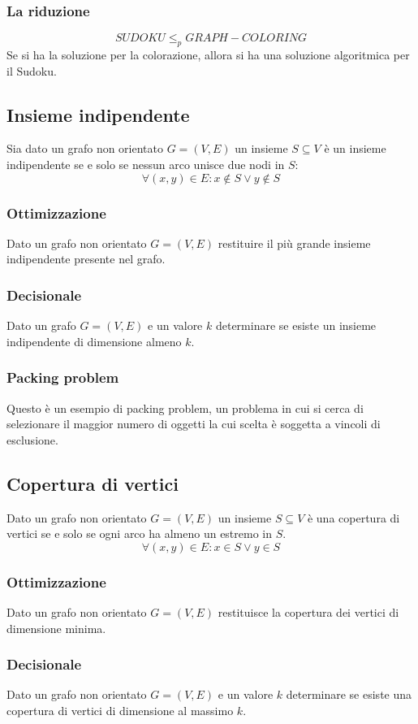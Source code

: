 \subsubsection{La riduzione}
$$SUDOKU \le_p GRAPH-COLORING$$
Se si ha la soluzione per la colorazione, allora si ha una soluzione algoritmica per il Sudoku.
\subsection{Insieme indipendente}
Sia dato un grafo non orientato $G=(V, E)$ un insieme $S\subseteq V$ \`e un insieme indipendente se e solo se nessun arco unisce due nodi in $S$:
$$\forall(x, y)\in E: x\not\in S\lor y\not\in S$$
\subsubsection{Ottimizzazione}
Dato un grafo non orientato $G=(V, E)$ restituire il pi\`u grande insieme indipendente presente nel grafo.
\subsubsection{Decisionale}
Dato un grafo $G=(V, E)$ e un valore $k$ determinare se esiste un insieme indipendente di dimensione almeno $k$.
\subsubsection{Packing problem}
Questo \`e un esempio di packing problem, un problema in cui si cerca di selezionare il maggior numero di oggetti la cui scelta \`e soggetta a vincoli di esclusione.
\subsection{Copertura di vertici}
Dato un grafo non orientato $G=(V, E)$ un insieme $S\subseteq V$ \`e una copertura di vertici se e solo se ogni arco ha almeno un estremo in $S$.
$$\forall(x, y)\in E: x\in S\lor y\in S$$
\subsubsection{Ottimizzazione}
Dato un grafo non orientato $G=(V, E)$ restituisce la copertura dei vertici di dimensione minima.
\subsubsection{Decisionale}
Dato un grafo non orientato $G=(V, E)$ e un valore $k$ determinare se esiste una copertura di vertici di dimensione al massimo $k$.
